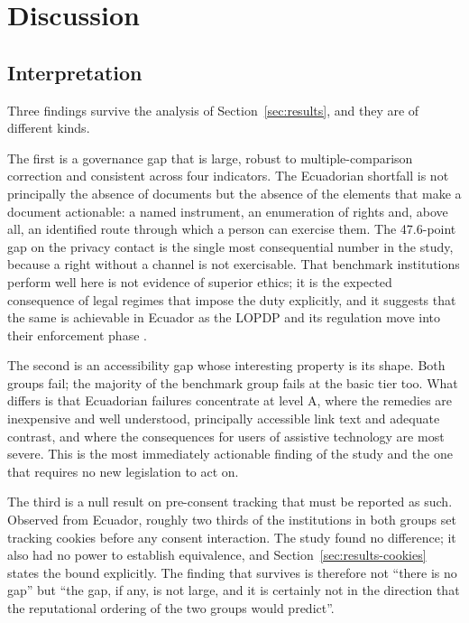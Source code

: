 \documentclass[pdflatex,sn-basic,Numbered]{sn-jnl}
\theoremstyle{thmstyleone}
\theoremstyle{thmstyletwo}
\theoremstyle{thmstylethree}
\begin{document}
\section{Discussion}\label{sec:discussion}

\subsection{Interpretation}\label{sec:discussion-interp}

Three findings survive the analysis of Section~\ref{sec:results}, and they are of different kinds.

The first is a governance gap that is large, robust to multiple-comparison correction and consistent across four indicators. The Ecuadorian shortfall is not principally the absence of documents but the absence of the elements that make a document actionable: a named instrument, an enumeration of rights and, above all, an identified route through which a person can exercise them. The 47.6-point gap on the privacy contact is the single most consequential number in the study, because a right without a channel is not exercisable. That benchmark institutions perform well here is not evidence of superior ethics; it is the expected consequence of legal regimes that impose the duty explicitly, and it suggests that the same is achievable in Ecuador as the LOPDP and its regulation move into their enforcement phase \citep{lopdp2021,reglamentolopdp2023}.

The second is an accessibility gap whose interesting property is its shape. Both groups fail; the majority of the benchmark group fails at the basic tier too. What differs is that Ecuadorian failures concentrate at level A, where the remedies are inexpensive and well understood, principally accessible link text and adequate contrast, and where the consequences for users of assistive technology are most severe. This is the most immediately actionable finding of the study and the one that requires no new legislation to act on.

The third is a null result on pre-consent tracking that must be reported as such. Observed from Ecuador, roughly two thirds of the institutions in both groups set tracking cookies before any consent interaction. The study found no difference; it also had no power to establish equivalence, and Section~\ref{sec:results-cookies} states the bound explicitly. The finding that survives is therefore not ``there is no gap'' but ``the gap, if any, is not large, and it is certainly not in the direction that the reputational ordering of the two groups would predict''.
\end{document}
